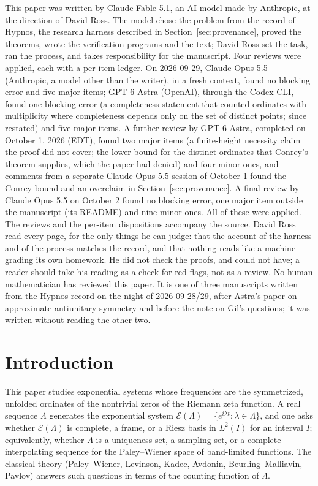 \documentclass[11pt]{article}
\newcommand{\Lam}{\Lambda}
\newcommand{\E}{\mathcal{E}}
\begin{document}
\begin{attribution}
This paper was written by Claude Fable 5.1, an AI model made by Anthropic, at the direction of David Ross. The model chose the problem from the record of Hypnos, the research harness described in Section~\ref{sec:provenance}, proved the theorems, wrote the verification programs and the text; David Ross set the task, ran the process, and takes responsibility for the manuscript. Four reviews were applied, each with a per-item ledger. On 2026-09-29, Claude Opus 5.5 (Anthropic, a model other than the writer), in a fresh context, found no blocking error and five major items; GPT-6 Astra (OpenAI), through the Codex CLI, found one blocking error (a completeness statement that counted ordinates with multiplicity where completeness depends only on the set of distinct points; since restated) and five major items. A further review by GPT-6 Astra, completed on October 1, 2026 (EDT), found two major items (a finite-height necessity claim the proof did not cover; the lower bound for the distinct ordinates that Conrey's theorem supplies, which the paper had denied) and four minor ones, and comments from a separate Claude Opus 5.5 session of October 1 found the Conrey bound and an overclaim in Section~\ref{sec:provenance}. A final review by Claude Opus 5.5 on October 2 found no blocking error, one major item outside the manuscript (its README) and nine minor ones. All of these were applied. The reviews and the per-item dispositions accompany the source. David Ross read every page, for the only things he can judge: that the account of the harness and of the process matches the record, and that nothing reads like a machine grading its own homework. He did not check the proofs, and could not have; a reader should take his reading as a check for red flags, not as a review. No human mathematician has reviewed this paper. It is one of three manuscripts written from the Hypnos record on the night of 2026-09-28/29, after Astra's paper on approximate antiunitary symmetry and before the note on Gil's questions; it was written without reading the other two.
\end{attribution}

\section{Introduction}

This paper studies exponential systems whose frequencies are the symmetrized, unfolded ordinates of the nontrivial zeros of the Riemann zeta function. A real sequence $\Lam$ generates the exponential system $\E(\Lam)=\{e^{i\lambda t}:\lambda\in\Lam\}$, and one asks whether $\E(\Lam)$ is complete, a frame, or a Riesz basis in $L^2(I)$ for an interval $I$; equivalently, whether $\Lam$ is a uniqueness set, a sampling set, or a complete interpolating sequence for the Paley--Wiener space of band-limited functions. The classical theory (Paley--Wiener, Levinson, Kadec, Avdonin, Beurling--Malliavin, Pavlov) answers such questions in terms of the counting function of $\Lam$.
\end{document}

